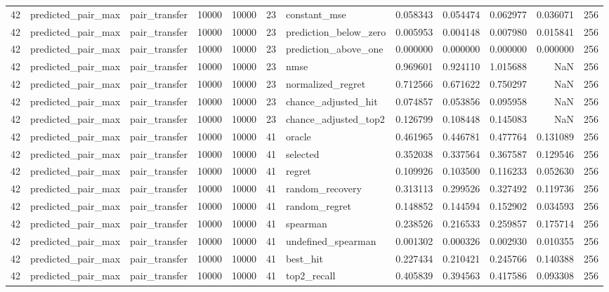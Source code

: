 \begin{tabular}{rllrrrlrrrrr}
42 & predicted_pair_max & pair_transfer & 10000 & 10000 & 23 & constant_mse & 0.058343 & 0.054474 & 0.062977 & 0.036071 & 256 \\
42 & predicted_pair_max & pair_transfer & 10000 & 10000 & 23 & prediction_below_zero & 0.005953 & 0.004148 & 0.007980 & 0.015841 & 256 \\
42 & predicted_pair_max & pair_transfer & 10000 & 10000 & 23 & prediction_above_one & 0.000000 & 0.000000 & 0.000000 & 0.000000 & 256 \\
42 & predicted_pair_max & pair_transfer & 10000 & 10000 & 23 & nmse & 0.969601 & 0.924110 & 1.015688 & NaN & 256 \\
42 & predicted_pair_max & pair_transfer & 10000 & 10000 & 23 & normalized_regret & 0.712566 & 0.671622 & 0.750297 & NaN & 256 \\
42 & predicted_pair_max & pair_transfer & 10000 & 10000 & 23 & chance_adjusted_hit & 0.074857 & 0.053856 & 0.095958 & NaN & 256 \\
42 & predicted_pair_max & pair_transfer & 10000 & 10000 & 23 & chance_adjusted_top2 & 0.126799 & 0.108448 & 0.145083 & NaN & 256 \\
42 & predicted_pair_max & pair_transfer & 10000 & 10000 & 41 & oracle & 0.461965 & 0.446781 & 0.477764 & 0.131089 & 256 \\
42 & predicted_pair_max & pair_transfer & 10000 & 10000 & 41 & selected & 0.352038 & 0.337564 & 0.367587 & 0.129546 & 256 \\
42 & predicted_pair_max & pair_transfer & 10000 & 10000 & 41 & regret & 0.109926 & 0.103500 & 0.116233 & 0.052630 & 256 \\
42 & predicted_pair_max & pair_transfer & 10000 & 10000 & 41 & random_recovery & 0.313113 & 0.299526 & 0.327492 & 0.119736 & 256 \\
42 & predicted_pair_max & pair_transfer & 10000 & 10000 & 41 & random_regret & 0.148852 & 0.144594 & 0.152902 & 0.034593 & 256 \\
42 & predicted_pair_max & pair_transfer & 10000 & 10000 & 41 & spearman & 0.238526 & 0.216533 & 0.259857 & 0.175714 & 256 \\
42 & predicted_pair_max & pair_transfer & 10000 & 10000 & 41 & undefined_spearman & 0.001302 & 0.000326 & 0.002930 & 0.010355 & 256 \\
42 & predicted_pair_max & pair_transfer & 10000 & 10000 & 41 & best_hit & 0.227434 & 0.210421 & 0.245766 & 0.140388 & 256 \\
42 & predicted_pair_max & pair_transfer & 10000 & 10000 & 41 & top2_recall & 0.405839 & 0.394563 & 0.417586 & 0.093308 & 256 \\

\end{tabular}
